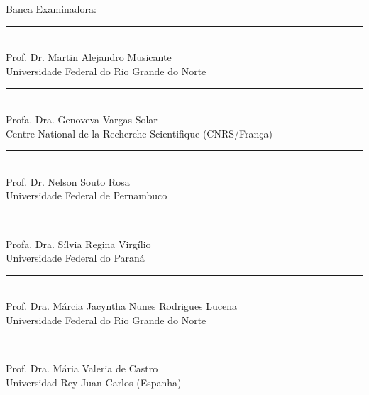 \newpage

{ 
  \fontsize{12}{14}
  \selectfont

  \noindent Banca Examinadora:

  \begin{center}

    {
      \fontsize{11}{13}
      \selectfont


    \rule{75mm}{0.2mm}\\
    Prof. Dr. Martin Alejandro Musicante\\
    Universidade Federal do Rio Grande do Norte\\
    [1.3cm]
     
    \rule{75mm}{0.2mm}\\
    Profa. Dra. Genoveva Vargas-Solar\\
    Centre National de la Recherche Scientifique (CNRS/Fran\c ca)\\
    [1.3cm]

   \rule{75mm}{0.2mm}\\
    Prof. Dr. Nelson Souto Rosa\\
      Universidade Federal de Pernambuco\\
    [1.3cm] 


    
     \rule{75mm}{0.2mm}\\
    Profa. Dra. S\'ilvia Regina Virg\'ilio\\
     Universidade Federal do Paran\'a\\
    [1.3cm]
    
      
    \rule{75mm}{0.2mm}\\
    Prof. Dra. M\'arcia Jacyntha Nunes Rodrigues Lucena\\
     Universidade Federal do Rio Grande do Norte\\
    [1.3cm]

   \rule{75mm}{0.2mm}\\
    Prof. Dra. M\'aria Valeria de Castro\\
     Universidad Rey Juan Carlos (Espanha)\\
    [1.3cm] 

    }
  \end{center}

}
